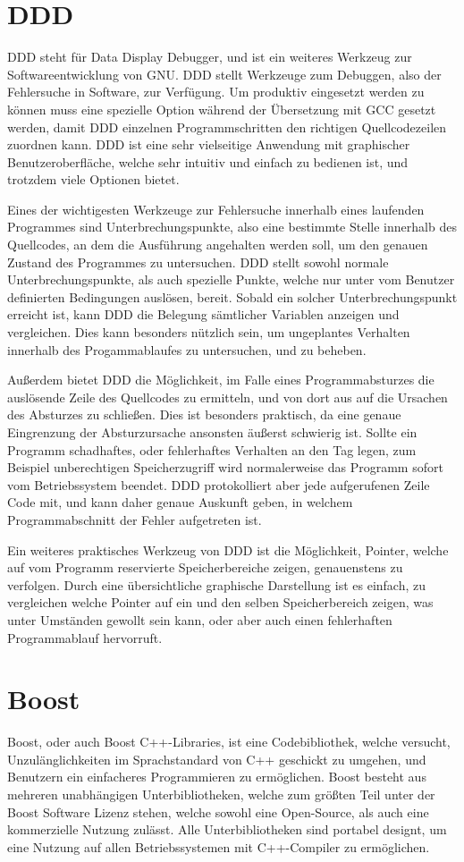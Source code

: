 \section{DDD}
DDD steht für Data Display Debugger, und ist ein weiteres Werkzeug zur Softwareentwicklung von GNU\@. DDD stellt Werkzeuge zum Debuggen, also der Fehlersuche in Software, zur Verfügung. Um produktiv eingesetzt
werden zu können muss eine spezielle Option während der Übersetzung mit GCC gesetzt werden, damit DDD einzelnen Programmschritten den richtigen Quellcodezeilen zuordnen kann. DDD ist eine sehr vielseitige
Anwendung mit graphischer Benutzeroberfläche, welche sehr intuitiv und einfach zu bedienen ist, und trotzdem viele Optionen bietet.

Eines der wichtigesten Werkzeuge zur Fehlersuche innerhalb eines laufenden Programmes sind Unterbrechungspunkte, also eine bestimmte Stelle innerhalb des Quellcodes, an dem die Ausführung angehalten werden 
soll, um den genauen Zustand des Programmes zu untersuchen. DDD stellt sowohl normale Unterbrechungspunkte, als auch spezielle Punkte, welche nur unter vom Benutzer definierten Bedingungen auslösen, bereit.
Sobald ein solcher Unterbrechungspunkt erreicht ist, kann DDD die Belegung sämtlicher Variablen anzeigen und vergleichen. Dies kann besonders nützlich sein, um ungeplantes Verhalten innerhalb des
Progamm\-ablaufes zu untersuchen, und zu beheben. 

Außerdem bietet DDD die Möglichkeit, im Falle eines Programmabsturzes die auslösende Zeile des Quellcodes zu ermitteln, und von dort aus auf die Ursachen des Absturzes zu schließen. Dies ist besonders
praktisch, da eine genaue Eingrenzung der Absturzursache ansonsten äußerst schwierig ist. Sollte ein Programm schadhaftes, oder fehlerhaftes Verhalten an den Tag legen, zum Beispiel unberechtigen Speicherzugriff
wird normalerweise das Programm sofort vom Betriebssystem beendet. DDD protokolliert aber jede aufgerufenen Zeile Code mit, und kann daher genaue Auskunft geben, in welchem Programmabschnitt der
Fehler aufgetreten ist.

Ein weiteres praktisches Werkzeug von DDD ist die Möglichkeit, Pointer, welche auf vom Programm reservierte Speicherbereiche zeigen, genauenstens zu verfolgen. Durch eine übersichtliche graphische Darstellung
ist es einfach, zu vergleichen welche Pointer auf ein und den selben Speicherbereich zeigen, was unter Umständen gewollt sein kann, oder aber auch einen fehlerhaften Programmablauf hervorruft.

\section{Boost}
\label{sec:boost}
Boost, oder auch Boost C++-Libraries, ist eine Codebibliothek, welche versucht, Un\-zu\-läng\-lich\-keiten im Sprachstandard von C++ geschickt zu umgehen, und Benutzern ein einfacheres Programmieren zu ermöglichen.
Boost besteht aus mehreren unabhängigen Unterbibliotheken, welche zum größten Teil unter der Boost Software Lizenz stehen, welche sowohl eine Open-Source, als auch eine kommerzielle Nutzung zulässt. Alle
Unterbibliotheken sind portabel designt, um eine Nutzung auf allen Betriebssystemen mit C++-Compiler zu ermöglichen. 

